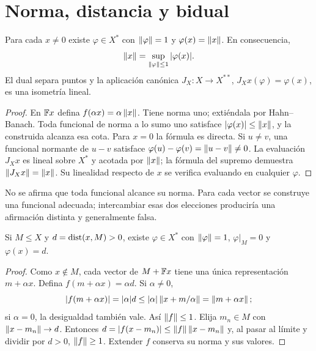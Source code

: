 \section{Norma, distancia y bidual}\label{lec:v3-02}
\begin{proposicion}\label{v3:normantes}
Para cada $x\ne0$ existe $\varphi\in X^*$ con $\left\lVert\varphi\right\rVert=1$ y $\varphi(x)=\left\lVert x\right\rVert$. En consecuencia,
\[
 \left\lVert x\right\rVert=\sup_{\left\lVert\varphi\right\rVert\leq1}|\varphi(x)|.
\]
El dual separa puntos y la aplicación canónica $J_X:X\to X^{**}$, $J_Xx(\varphi)=\varphi(x)$, es una isometría lineal.
\end{proposicion}
\begin{proof}
En $\mathbb F x$ defina $f(\alpha x)=\alpha\left\lVert x\right\rVert$. Tiene norma uno; extiéndala por Hahn--Banach. Toda funcional de norma a lo sumo uno satisface $|\varphi(x)|\leq\left\lVert x\right\rVert$, y la construida alcanza esa cota. Para $x=0$ la fórmula es directa. Si $u\ne v$, una funcional normante de $u-v$ satisface $\varphi(u)-\varphi(v)=\left\lVert u-v\right\rVert\ne0$. La evaluación $J_Xx$ es lineal sobre $X^*$ y acotada por $\left\lVert x\right\rVert$; la fórmula del supremo demuestra $\left\lVert J_Xx\right\rVert=\left\lVert x\right\rVert$. Su linealidad respecto de $x$ se verifica evaluando en cualquier $\varphi$.
\end{proof}
No se afirma que toda funcional alcance su norma. Para cada vector se construye una funcional adecuada; intercambiar esas dos elecciones produciría una afirmación distinta y generalmente falsa.

\begin{proposicion}\label{v3:distancia-dual}
Si $M\leq X$ y $d=\operatorname{dist}(x,M)>0$, existe $\varphi\in X^*$ con $\left\lVert\varphi\right\rVert=1$, $\varphi|_M=0$ y $\varphi(x)=d$.
\end{proposicion}
\begin{proof}
Como $x\notin M$, cada vector de $M+\mathbb F x$ tiene una única representación $m+\alpha x$. Defina $f(m+\alpha x)=\alpha d$. Si $\alpha\ne0$,
\[
 |f(m+\alpha x)|=|\alpha|d\leq|\alpha|\left\lVert x+m/\alpha\right\rVert=\left\lVert m+\alpha x\right\rVert;
\]
si $\alpha=0$, la desigualdad también vale. Así $\left\lVert f\right\rVert\leq1$. Elija $m_n\in M$ con $\left\lVert x-m_n\right\rVert\to d$. Entonces $d=|f(x-m_n)|\leq\left\lVert f\right\rVert\left\lVert x-m_n\right\rVert$ y, al pasar al límite y dividir por $d>0$, $\left\lVert f\right\rVert\geq1$. Extender $f$ conserva su norma y sus valores.
\end{proof}

